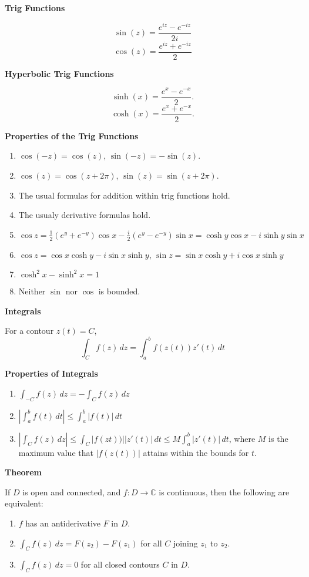 \documentclass{article}
\begin{document}
\medskip\noindent\textbf{Trig Functions}

    $$\sin(z) = \frac{e^{iz} - e^{-iz}}{2i}$$
    $$\cos(z) = \frac{e^{iz}+e^{-iz}}{2}$$

\medskip\noindent\textbf{Hyperbolic Trig Functions}

    $$\sinh(x) = \frac{e^x - e^{-x}}2.$$
    $$\cosh(x) = \frac{e^x + e^{-x}}2.$$

\medskip\noindent\textbf{Properties of the Trig Functions}
\begin{enumerate}
    \item $\cos(-z) = \cos(z)$, $\sin(-z) = -\sin(z)$.
    \item $\cos(z) = \cos(z + 2\pi)$, $\sin(z) = \sin(z + 2\pi)$.
    \item The usual formulas for addition within trig functions hold.
    \item The usualy derivative formulas hold.
    \item $\cos z = \frac12(e^{y} + e^{-y})\cos x - \frac i2(e^y-e^{-y})\sin x = \cosh y \cos x - i\sinh y \sin x$
    \item $\cos z = \cos x \cosh y - i\sin x \sinh y$, $\sin z = \sin x \cosh y + i \cos x \sinh y$
    \item $\cosh^2 x - \sinh^2 x = 1$
    \item Neither $\sin$ nor $\cos$ is bounded.
\end{enumerate}

\medskip\noindent\textbf{Integrals}
    
    For a contour $z(t) = C$,
    $$\int_{C} f(z)\,dz = \int_a^b f(z(t))z'(t)\,dt$$

\medskip\noindent\textbf{Properties of Integrals}
\begin{enumerate}
    \item $\int_{-C}f(z)\,dz = -\int_Cf(z)\,dz$
    \item $|\int_a^bf(t)\,dt| \leq \int_a^b|f(t)|\,dt$
    \item $|\int_Cf(z)\,dz| \leq \int_C |f(zt))| |z'(t)|\,dt \leq M\int_a^b|z'(t)|\,dt$, where $M$ is the maximum value that $|f(z(t))|$ attains within the bounds for $t$.
\end{enumerate}

\medskip\noindent\textbf{Theorem}

    If $D$ is open and connected, and $f: D \to \mathbb C$ is continuous, then the following are equivalent:
    \begin{enumerate}
        \item $f$ has an antiderivative $F$ in $D$.
        \item $\int_C f(z)\,dz = F(z_2) - F(z_1)$ for all $C$ joining $z_1$ to $z_2$.
        \item $\int_Cf(z)\,dz = 0$ for all closed contours $C$ in $D$.
    \end{enumerate}
\end{document}
